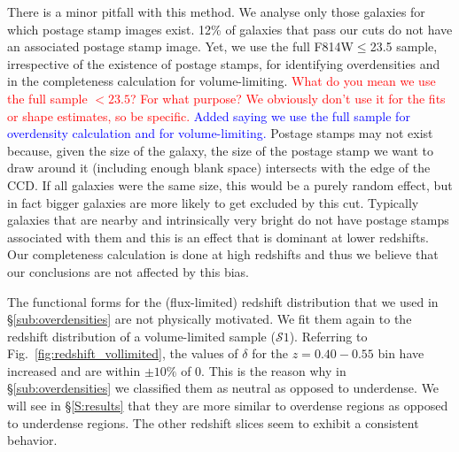 \documentclass[twocolumn,useAMS,usenatbib]{mn2e}
\newcommand{\rachel}[1]{{\textcolor{red}{#1}}}
\newcommand{\arun}[1]{{\textcolor{blue}{#1}}}
\newcommand{\s}{\ensuremath{\mathcal{S}}}
\begin{document}
There is a minor pitfall with this method. We analyse only those galaxies for which postage stamp images exist.
12\% of galaxies that pass our cuts do not have an associated postage stamp image.
Yet, we use the full F814W$\le$23.5 sample, irrespective of the existence of postage stamps, for identifying overdensities and in the completeness calculation for volume-limiting.
\rachel{What do you mean we use the full sample  $<23.5$?  For what purpose?  We obviously don't use it for the fits  or shape estimates, so be specific.}
\arun{Added saying we use the full sample for overdensity calculation and for volume-limiting.}
Postage stamps may not exist because, given the size of the galaxy, the size of the postage stamp we want to draw around it (including enough blank space) intersects with the edge of the CCD.
If all galaxies were the same size, this would be a purely random effect, but in fact bigger galaxies are more likely to get excluded by this cut. 
Typically galaxies that are nearby and intrinsically very bright do not have postage stamps associated with them and this is an effect that is dominant at lower redshifts. 
Our completeness calculation is done at high redshifts and thus we believe that our conclusions are not affected by this bias. 


The functional forms for the (flux-limited) redshift distribution that we used in \S\ref{sub:overdensities} are not physically motivated. We fit them again to the  
redshift distribution of a volume-limited sample (\s$1$). Referring to Fig.~\ref{fig:redshift_vollimited}, the values of $\delta$ for the $z=0.40-0.55$ bin have increased and are within $\pm 10\%$ of 0. This is the reason why in \S\ref{sub:overdensities} we classified them as neutral as opposed to underdense.
We will see in \S\ref{S:results} that they are more similar to overdense regions as opposed to underdense regions.
The other redshift slices seem to exhibit a consistent behavior. 
\end{document}
